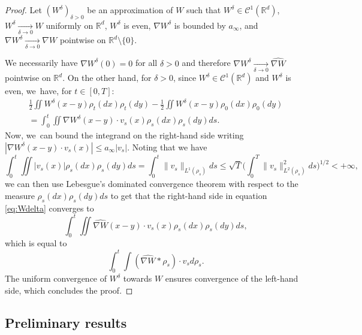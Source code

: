 \documentclass[JEP,XML,SOM,Unicode, NoFloatCountersInSection,published]{cedram}
\def\RR{\mathbb{R}}
\newcommand{\limi}[2]{\underset{#1 \to #2}{\longrightarrow}}
\def\calC{{\mathcal C}}
\def\nabWchapo{\widehat{\nabla W}}
\theoremstyle{plain}
\theoremstyle{definition}
\begin{document}
\begin{proof}
Let $(W^\delta)_{\delta > 0}$ be an approximation of $W$ such that $W^\delta \in \calC^1(\RR^d)$, $W^\delta \limi{\delta}{0} W$ uniformly on $\RR^d$, $W^\delta$ is even, $\nabla W^\delta$ is bounded by $a_\infty$, and $\nabla W^\delta \limi{\delta}{0} \nabla W$ pointwise on $\RR^d \setminus \{0\}$.

We necessarily have $\nabla W^\delta(0) = 0$ for all $\delta>0$ and therefore $\nabla W^\delta \limi{\delta}{0} \nabWchapo$ pointwise on $\RR^d$. On the other hand, for $\delta > 0$, since $W^\delta \in \calC^1(\RR^d)$ and $W^\delta$ is even, we~have, for $t \in [0,T]$:
\begin{multline}\label{eq:Wdelta}
\frac 12 \iint W^\delta(x-y) \rho_t(dx) \rho_t(dy) - \frac 12 \iint W^\delta(x-y) \rho_0(dx) \rho_0(dy) \\
= \int_0^t \iint \nabla W^\delta(x-y) \cdot v_s(x) \rho_s(dx) \rho_s(dy) ds.
\end{multline}
Now, we~can bound the integrand on the right-hand side writing $|\nabla W^\delta(x-y) \cdot v_s(x)| \leq a_\infty |v_s|$. Noting that we have
\[
\int_0^t \iint |v_s(x)| \rho_s(dx)\rho_s(dy)ds = \int_0^t \|v_s\|_{L^1(\rho_s)} ds \leq \sqrt{T} \Big(\int_0^T \|v_s\|_{L^2(\rho_s)}^2 ds\Big)^{1/2} < +\infty,
\]
we can then use Lebesgue's dominated convergence theorem with respect to the measure $\rho_s(dx)\rho_s(dy)ds$ to get that the right-hand side in equation \eqref{eq:Wdelta} converges to
\[
\int_0^t \iint \nabWchapo(x-y) \cdot v_s(x) \rho_s(dx) \rho_s(dy) ds,
\]
which is equal to
\[
\int_0^t \int (\nabWchapo * \rho_s) \cdot v_s d\rho_s.
\]
The uniform convergence of $W^\delta$ towards $W$ ensures convergence of the left-hand side, which concludes the proof.
\end{proof}

\subsection{Preliminary results}
\end{document}
